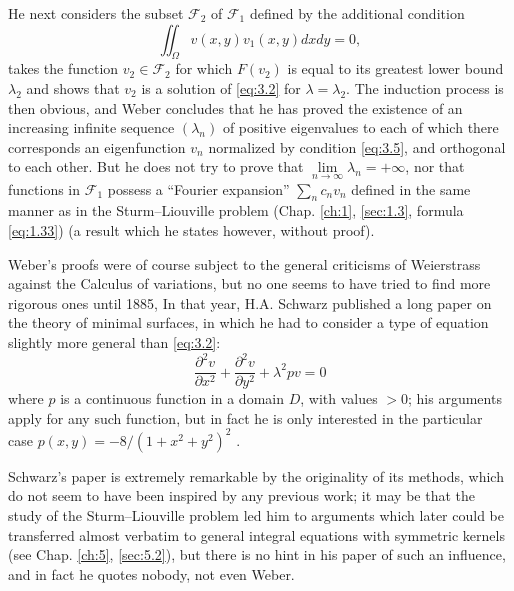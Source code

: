 \documentclass[12pt,a4paper,leqno,twoside]{extbook}
\begin{document}
He next considers the subset \(\mathcal{F}_2\) of \(\mathcal{F}_1\) defined by the additional condition
\begin{equation}
    \label{eq:3.6}
    \iint_\Omega v(x, y)v_1(x, y)dxdy = 0,
\end{equation}
takes the function \(v_2 \in \mathcal{F}_2\) for which \(F(v_2)\) is equal to its greatest lower bound \(\lambda_2\) and shows that \(v_2\) is a solution of \eqref{eq:3.2} for \(\lambda = \lambda_2\). The induction process is then obvious, and Weber concludes that he has proved the existence of an increasing infinite sequence \(\left(\lambda_n\right)\) of positive eigenvalues to each of which there corresponds an eigenfunction \(v_n\) normalized by condition \eqref{eq:3.5}, and orthogonal to each other. But he does not try to prove that \(\lim\limits_{n \to \infty} \lambda_n = +\infty\), nor that functions in \(\mathcal{F}_1\) possess a ``Fourier expansion'' \(\sum\limits_n c_n v_n\) defined in the same manner as in the Sturm--Liouville problem (Chap. \ref{ch:1}, \ref{sec:1.3}, formula \eqref{eq:1.33}) (a result which he states however, without proof).

Weber's proofs were of course subject to the general criticisms of Weierstrass against the Calculus of variations, but no one seems to have tried to find more rigorous ones until 1885, In that year, H.A. Schwarz published a long paper on the theory of minimal surfaces, in which he had to consider a type of equation slightly more general than \eqref{eq:3.2}:
\begin{equation}
    \label{eq:3.7}
    \frac{\partial^2 v}{\partial x^2} + \frac{\partial^2 v}{\partial y^2} + \lambda^2 pv = 0
\end{equation}
where \(p\) is a continuous function in a domain \(D\), with values \(> 0\); his arguments apply for any such function, but in fact he is only interested in the particular case \(p(x, y) = - 8/(1 + x^2 + y^2)^2\) \cite[vol.~I, p.~223--269]{195}.

Schwarz's paper is extremely remarkable by the originality of its methods, which do not seem to have been inspired by any previous work; it may be that the study of the Sturm--Liouville problem led him to arguments which later could be transferred almost verbatim to general integral equations with symmetric kernels (see Chap. \ref{ch:5}, \ref{sec:5.2}), but there is no hint in his paper of such an influence, and in fact he quotes nobody, not even Weber.
\end{document}
